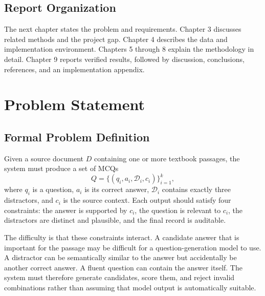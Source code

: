 \documentclass[12pt,a4paper]{report}
\begin{document}
\section{Report Organization}
The next chapter states the problem and requirements. Chapter 3 discusses related methods and the project gap. Chapter 4 describes the data and implementation environment. Chapters 5 through 8 explain the methodology in detail. Chapter 9 reports verified results, followed by discussion, conclusions, references, and an implementation appendix.

\clearpage
\chapter{Problem Statement}
\section{Formal Problem Definition}
Given a source document $D$ containing one or more textbook passages, the system must produce a set of MCQs
\[
Q = \{(q_i,a_i,\mathcal{D}_i,c_i)\}_{i=1}^{k},
\]
where $q_i$ is a question, $a_i$ is its correct answer, $\mathcal{D}_i$ contains exactly three distractors, and $c_i$ is the source context. Each output should satisfy four constraints: the answer is supported by $c_i$, the question is relevant to $c_i$, the distractors are distinct and plausible, and the final record is auditable.

The difficulty is that these constraints interact. A candidate answer that is important for the passage may be difficult for a question-generation model to use. A distractor can be semantically similar to the answer but accidentally be another correct answer. A fluent question can contain the answer itself. The system must therefore generate candidates, score them, and reject invalid combinations rather than assuming that model output is automatically suitable.
\end{document}
